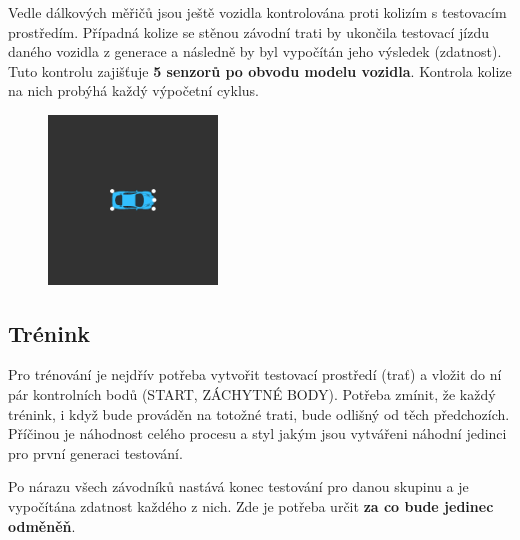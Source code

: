 \documentclass[a4paper,12pt]{article}
\newcommand{\tab}
{
    \hspace*{1em}
}
\begin{document}
            Vedle dálkových měřičů jsou ještě vozidla kontrolována proti kolizím s testovacím 
            prostředím. Případná kolize se stěnou závodní trati by ukončila testovací jízdu
            daného vozidla z generace a následně by byl vypočítán jeho výsledek (zdatnost).
            Tuto kontrolu zajišťuje \textbf{5 senzorů po obvodu modelu vozidla}. Kontrola
            kolize na nich probýhá každý výpočetní cyklus.
            \begin{figure}[H]
                \centering
                \includegraphics[trim = 7cm 7cm 7cm 7cm, clip, width=0.4\textwidth]{data/collisionpoints.png}
                \label{fig:collisionpoints}
            \end{figure}

        \vspace*{-3em}
        \subsection{Trénink}
            Pro trénování je nejdřív potřeba vytvořit testovací prostředí (trať) a vložit
            do ní pár kontrolních bodů (START, ZÁCHYTNÉ BODY). Potřeba zmínit,
            že každý trénink, i když bude prováděn na totožné trati, bude odlišný od těch
            předchozích. Příčinou je náhodnost celého procesu a styl jakým jsou vytvářeni
            náhodní jedinci pro první generaci testování.

            \tab Po nárazu všech závodníků nastává konec testování pro danou skupinu a 
            je vypočítána zdatnost každého z nich. Zde je potřeba určit \textbf{za co bude jedinec
            odměněň}. 
            
\end{document}
